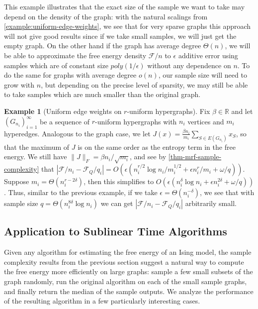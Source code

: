 \documentclass[final, 12pt]{colt2018}
\newcommand{\F}{\mathcal{F}}
\theoremstyle{definition}
\newtheorem{example}[theorem]{Example}
\theoremstyle{plain}
\begin{document}
This example illustrates that the exact size of the sample we want to take may depend on the density of the graph: with
the natural scalings from \cref{example:uniform-edge-weights}, we see that for very sparse graphs this approach will not give good results since if we take small samples, we will just get the empty graph. On the other hand if the graph has average degree $\Theta(n)$, we will be able to approximate the free energy density $\F/n$ to $\epsilon$ additive error using samples which are of constant size $poly(1/\epsilon)$ without any dependence on $n$. To do the same for graphs with average degree $o(n)$, our sample size will need to grow with $n$, but depending on the precise level of sparsity, we may still be able to take samples which are much smaller than the original graph.


\begin{example}[Uniform edge weights on $r$-uniform hypergraphs]
Fix $\beta \in \mathbb{R}$ and
let $(G_{n_i})_{i=1}^{\infty}$ be a sequence of $r$-uniform hypergraphs
with $n_i$ vertices and $m_i$ hyperedges. Analogous to the graph case, we let $J(x) = \frac{\beta n_i}{m_i} \sum_{S \in E(G_{n_i})} x_S$,
so that the maximum of $J$ is on the same order as the entropy term in the free energy. We still have $\|J\|_F = \beta n_i/\sqrt{m_i}$, and see by \cref{thm-mrf-sample-complexity} that $|\mathcal{F}/n_i - \mathcal{F}_Q/q_i| = O(\epsilon (n_i^{r/2}\log{n_i}/m_i^{1/2} + \epsilon n_i^r/m_i +  \omega/q))$. Suppose $m_i = \Theta(n_i^{r - 2\delta})$, then
this simplifies to $O(\epsilon (n_i^{\delta} \log n_i + \epsilon n_i^{2 \delta} +  \omega/q))$. Thus, similar to the previous example, if we take $\epsilon = \Theta(n_i^{-\delta})$, we see that with sample size $q = \Theta(n_i^{8 \delta} \log n_i)$ we can get $|\mathcal{F}/n_i - \mathcal{F}_Q/q_i|$ arbitrarily small.
\end{example}


\subsection{Application to Sublinear Time Algorithms}
Given any algorithm for estimating the 
free energy of an Ising model, the sample complexity results from the previous section suggest a natural way to compute the free energy more efficiently on large graphs: sample a few small subsets of the graph randomly, run the original
algorithm on each of the small sample graphs, and finally return the median of the sample outputs. We analyze the performance of the resulting algorithm
in a few particularly interesting cases. 
\end{document}

